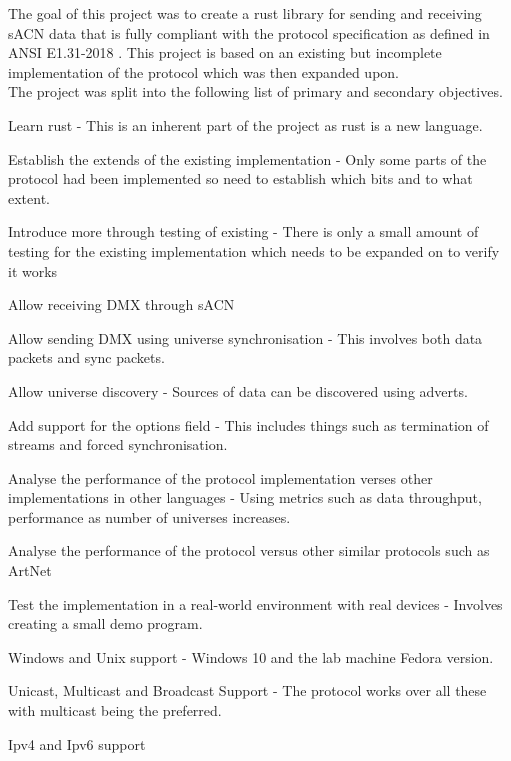\documentclass[11pt,a4paper,notitlepage]{report}
\begin{document}
	The goal of this project was to create a rust library for sending and receiving sACN data that is fully compliant with the protocol specification as defined in ANSI E1.31-2018 \cite{ANSI_E1.31}. This project is based on an existing but incomplete implementation of the protocol \cite{ORIGNIAL_IMPL} which was then expanded upon.\\
	
	The project was split into the following list of primary and secondary objectives.\\
	\begin{list}{}{Primary}
		\item Learn rust - This is an inherent part of the project as rust is a new language.
		\item Establish the extends of the existing implementation - Only some parts of the protocol had been implemented so need to establish which bits and to what extent.
		\item Introduce more through testing of existing - There is only a small amount of testing for the existing implementation which needs to be expanded on to verify it works
		\item Allow receiving DMX through sACN
		\item Allow sending DMX using universe synchronisation - This involves both data packets and sync packets.
		\item Allow universe discovery - Sources of data can be discovered using adverts.
		\item Add support for the options field - This includes things such as termination of streams and forced synchronisation.
	\end{list}
	\begin{list}{}{Secondary}
		\item Analyse the performance of the protocol implementation verses other implementations in other languages - Using metrics such as data throughput, performance as number of universes increases.
		\item Analyse the performance of the protocol versus other similar protocols such as ArtNet \cite{ArtNet}
		\item Test the implementation in a real-world environment with real devices - Involves creating a small demo program.
		\item Windows and Unix support - Windows 10 and the lab machine Fedora version.
		\item Unicast, Multicast and Broadcast Support - The protocol works over all these with multicast being the preferred.
		\item Ipv4 and Ipv6 support
	\end{list}
	
\end{document}
